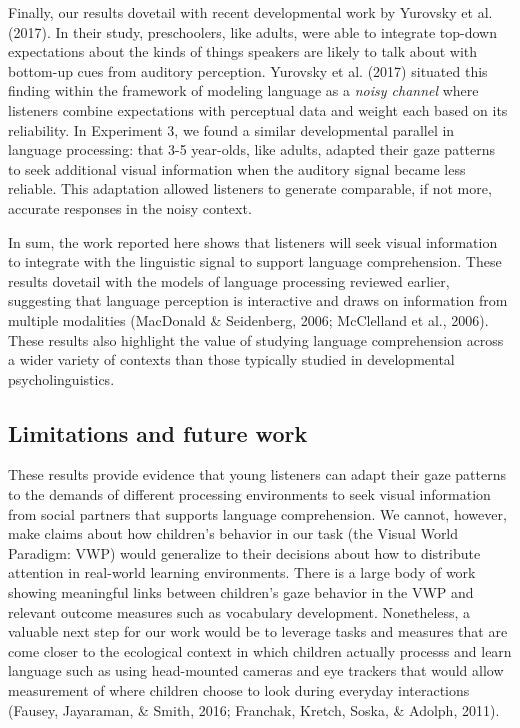 \documentclass[english,floatsintext,man]{apa6}
\begin{document}
Finally, our results dovetail with recent developmental work by Yurovsky
et al. (2017). In their study, preschoolers, like adults, were able to
integrate top-down expectations about the kinds of things speakers are
likely to talk about with bottom-up cues from auditory perception.
Yurovsky et al. (2017) situated this finding within the framework of
modeling language as a \emph{noisy channel} where listeners combine
expectations with perceptual data and weight each based on its
reliability. In Experiment 3, we found a similar developmental parallel
in language processing: that 3-5 year-olds, like adults, adapted their
gaze patterns to seek additional visual information when the auditory
signal became less reliable. This adaptation allowed listeners to
generate comparable, if not more, accurate responses in the noisy
context.

In sum, the work reported here shows that listeners will seek visual
information to integrate with the linguistic signal to support language
comprehension. These results dovetail with the models of language
processing reviewed earlier, suggesting that language perception is
interactive and draws on information from multiple modalities (MacDonald
\& Seidenberg, 2006; McClelland et al., 2006). These results also
highlight the value of studying language comprehension across a wider
variety of contexts than those typically studied in developmental
psycholinguistics.

\hypertarget{limitations-and-future-work}{%
\subsection{Limitations and future
work}\label{limitations-and-future-work}}

These results provide evidence that young listeners can adapt their gaze
patterns to the demands of different processing environments to seek
visual information from social partners that supports language
comprehension. We cannot, however, make claims about how children's
behavior in our task (the Visual World Paradigm: VWP) would generalize
to their decisions about how to distribute attention in real-world
learning environments. There is a large body of work showing meaningful
links between children's gaze behavior in the VWP and relevant outcome
measures such as vocabulary development. Nonetheless, a valuable next
step for our work would be to leverage tasks and measures that are come
closer to the ecological context in which children actually processs and
learn language such as using head-mounted cameras and eye trackers that
would allow measurement of where children choose to look during everyday
interactions (Fausey, Jayaraman, \& Smith, 2016; Franchak, Kretch,
Soska, \& Adolph, 2011).
\end{document}
